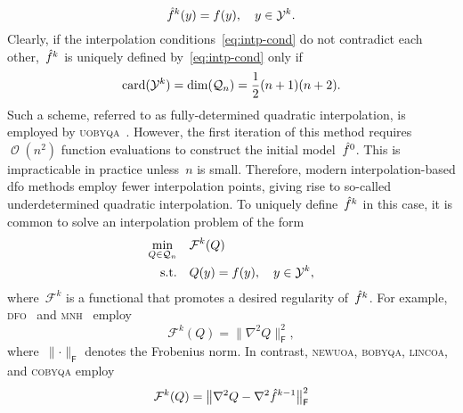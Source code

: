 \documentclass{article}
\numberwithin{equation}{section}
\theoremstyle{definition}
\theoremstyle{plain}
\theoremstyle{remark}
\DeclareMathOperator{\bigo}{\mathcal{O}}
\DeclareMathOperator{\card}{card}
\newcommand*{\norm}[2][]{#1\lVert#2#1\rVert}
\newcommand*{\obj}{f}
\newcommand*{\objm}[1][]{\hat{\obj}\ifblank{#1}{}{^{#1}}}
\newcommand*{\qpoly}{\mathcal{Q}_n}
\newcommand*{\solvername}[1]{\textsc{#1}\xspace}
\newcommand*{\xpt}[1][]{\mathcal{Y}\ifblank{#1}{}{^{#1}}}
\begin{document}
\begin{equation}
    \label{eq:intp-cond}
    \objm[k](y) = \obj(y), \quad y \in \xpt[k].
\end{equation}
Clearly, if the interpolation conditions~\eqref{eq:intp-cond} do not contradict each other,~$\objm[k]$ is uniquely defined by~\eqref{eq:intp-cond} only if
\begin{equation*}
    \card(\xpt[k]) = \dim(\qpoly) = \frac{1}{2} (n + 1) (n + 2).
\end{equation*}
Such a scheme, referred to as fully-determined quadratic interpolation, is employed by \solvername{uobyqa}~\cite{Powell_2002}.
However, the first iteration of this method requires~$\bigo(n^2)$ function evaluations to construct the initial model~$\objm[0]$.
This is impracticable in practice unless~$n$ is small.
Therefore, modern interpolation-based \gls{dfo} methods employ fewer interpolation points, giving rise to so-called underdetermined quadratic interpolation.
To uniquely define~$\objm[k]$ in this case, it is common to solve an interpolation problem of the form
\begin{equation}
    \label{eq:intp-var}
    \begin{aligned}
        \min_{Q \in \qpoly} & \quad \mathcal{F}^k(Q)\\
        \text{s.t.}         & \quad Q(y) = \obj(y), \quad y \in \xpt[k],
    \end{aligned}
\end{equation}
where~$\mathcal{F}^k$ is a functional that promotes a desired regularity of~$\objm[k]$.
For example, \solvername{dfo}~\cite{Conn_Scheinberg_Toint_1998} and \solvername{mnh}~\cite{Wild_2008} employ
\begin{equation}
    \label{eq:mnh}
    \mathcal{F}^k(Q) = \norm[\big]{\nabla^2 Q}_{\mathsf{F}}^2,
\end{equation}
where~$\norm{\cdot}_{\mathsf{F}}$ denotes the Frobenius norm. In contrast, \solvername{newuoa}, \solvername{bobyqa}, \solvername{lincoa}, and \solvername{cobyqa} employ
\begin{equation}
    \label{eq:df-psb}
    \mathcal{F}^k(Q) = \norm[\big]{\nabla^2 Q - \nabla^2 \objm[k - 1]}_{\mathsf{F}}^2
\end{equation}
\end{document}

